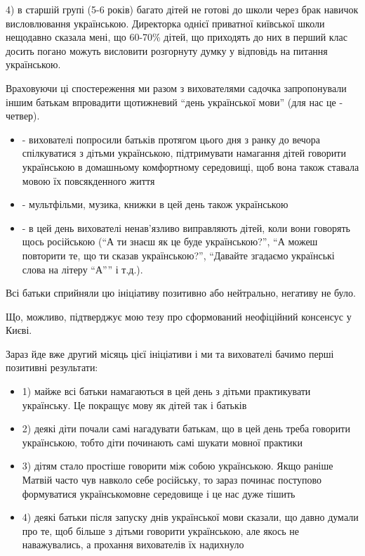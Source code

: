 4) в старшій групі (5-6 років) багато дітей не готові до школи через брак
навичок висловлювання українською. Директорка однієї приватної київської школи
нещодавно сказала мені, що 60-70\% дітей, що приходять до них в перший клас
досить погано можуть висловити розгорнуту думку у відповідь на питання
українською.

Враховуючи ці спостереження ми разом з вихователями садочка запропонували іншим
батькам впровадити щотижневий “день української мови” (для нас це - четвер). 

\begin{itemize}
\item - вихователі попросили батьків протягом цього дня з ранку до вечора
				спілкуватися з дітьми українською, підтримувати намагання дітей
				говорити українською в домашньому комфортному середовищі, щоб вона
				також ставала мовою їх повсякденного життя

\item - мультфільми, музика, книжки в цей день також українською

\item - в цей день вихователі ненав’язливо виправляють дітей, коли вони
				говорять щось російською (“А ти знаєш як це буде українською?”, “А
				можеш повторити те, що ти сказав українською?”, “Давайте згадаємо
				українські слова на літеру “А”” і т.д.). 
\end{itemize}

Всі батьки сприйняли цю ініціативу позитивно або нейтрально, негативу не було.

Що, можливо, підтверджує мою тезу про сформований неофіційний консенсус у
Києві.

Зараз йде вже другий місяць цієї ініціативи і ми та вихователі бачимо перші позитивні результати:

\begin{itemize}
\item 1) майже всі батьки намагаються в цей день з дітьми практикувати українську. Це покращує мову як дітей так і батьків 🙂
\item 2) деякі діти почали самі нагадувати батькам, що в цей день треба говорити українською, тобто діти починають самі шукати мовної практики 🙂
\item 3) дітям стало простіше говорити між собою українською. Якщо раніше Матвій
часто чув навколо себе російську, то зараз починає поступово формуватися
українськомовне середовище і це нас дуже тішить 🙂

\item 4) деякі батьки після запуску днів української мови сказали, що давно думали
про те, щоб більше з дітьми говорити українською, але якось не наважувались, а
прохання вихователів їх надихнуло
\end{itemize}

